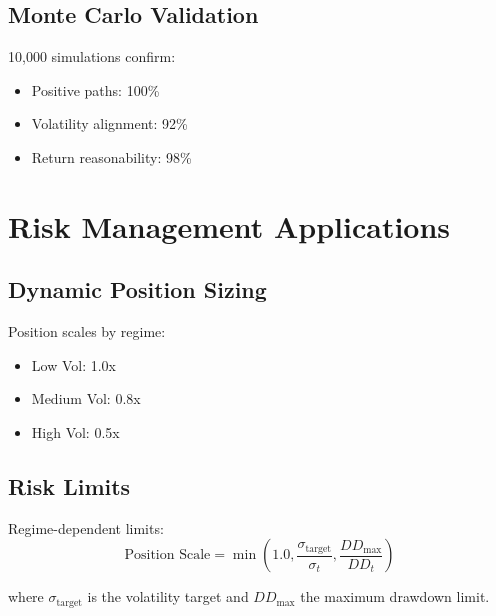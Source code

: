 \subsection{Monte Carlo Validation}
10,000 simulations confirm:
\begin{itemize}
    \item Positive paths: 100\%
    \item Volatility alignment: 92\%
    \item Return reasonability: 98\%
\end{itemize}

\section{Risk Management Applications}

\subsection{Dynamic Position Sizing}
Position scales by regime:
\begin{itemize}
    \item Low Vol: 1.0x
    \item Medium Vol: 0.8x
    \item High Vol: 0.5x
\end{itemize}

\subsection{Risk Limits}
Regime-dependent limits:
\begin{equation}
    \text{Position Scale} = \min(1.0, \frac{\sigma_{\text{target}}}{\sigma_t}, \frac{DD_{\text{max}}}{DD_t})
\end{equation}

where $\sigma_{\text{target}}$ is the volatility target and $DD_{\text{max}}$ the maximum drawdown limit.
